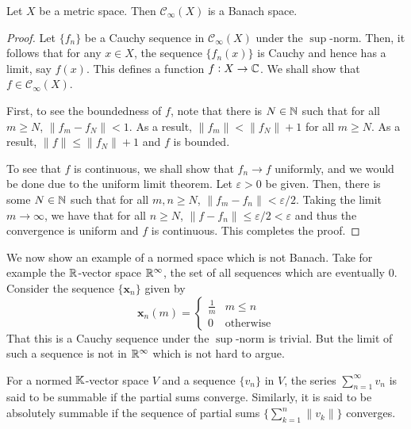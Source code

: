 \begin{theorem}
    Let $X$ be a metric space. Then $\mathcal C_\infty(X)$ is a Banach space.
\end{theorem}
\begin{proof}
    Let $\{f_n\}$ be a Cauchy sequence in $\mathcal C_\infty(X)$ under the $\sup$-norm. Then, it follows that for any $x\in X$, the sequence $\{f_n(x)\}$ is Cauchy and hence has a limit, say $f(x)$. This defines a function $f: X\to\mathbb{C}$. We shall show that $f\in\mathcal C_\infty(X)$. 

    First, to see the boundedness of $f$, note that there is $N\in\mathbb{N}$ such that for all $m\ge N$, $\|f_m - f_N\| < 1$. As a result, $\|f_m\| < \|f_N\| + 1$ for all $m\ge N$. As a result, $\|f\|\le\|f_N\| + 1$ and $f$ is bounded.

    To see that $f$ is continuous, we shall show that $f_n\to f$ uniformly, and we would be done due to the uniform limit theorem. Let $\varepsilon > 0$ be given. Then, there is some $N\in\mathbb{N}$ such that for all $m,n\ge N$, $\|f_m - f_n\| < \varepsilon/2$. Taking the limit $m\to\infty$, we have that for all $n\ge N$, $\|f - f_n\|\le\varepsilon/2 < \varepsilon$ and thus the convergence is uniform and $f$ is continuous. This completes the proof.
\end{proof}

\begin{mdframed}
    We now show an example of a normed space which is not Banach. Take for example the $\mathbb{R}$-vector space $\mathbb{R}^\infty$, the set of all sequences which are eventually $0$. Consider the sequence $\{\mathbf x_n\}$ given by 
    \begin{equation*}
        \mathbf x_n(m) = 
        \begin{cases}
            \frac{1}{m} & m\le n\\
            0 & \text{otherwise}
        \end{cases}
    \end{equation*}
    That this is a Cauchy sequence under the $\sup$-norm is trivial. But the limit of such a sequence is not in $\mathbb{R}^\infty$ which is not hard to argue.
\end{mdframed}

\begin{definition}
    For a normed $\mathbb K$-vector space $V$ and a sequence $\{v_n\}$ in $V$, the series $\sum_{n = 1}^\infty v_n$ is said to be summable if the partial sums converge. Similarly, it is said to be absolutely summable if the sequence of partial sums $\{\sum_{k = 1}^n \|v_k\|\}$ converges.
\end{definition}

